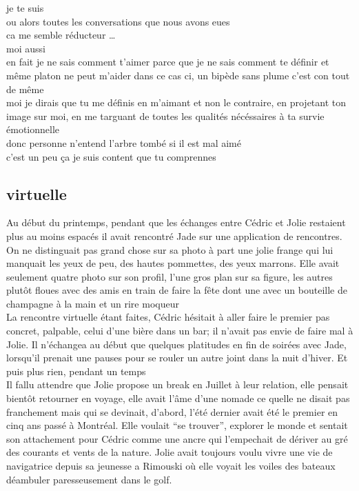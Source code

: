 \documentclass{article}
\begin{document}
je te suis\\

ou alors toutes les conversations que nous avons eues\\

ca me semble réducteur \ldots \\

moi aussi\\

en fait je ne sais comment t'aimer parce que je ne sais comment te définir
et même platon ne peut m'aider dans ce cas ci, un bipède sans plume  c'est con
tout de même\\

moi je dirais que tu me définis en m'aimant et non le contraire, en projetant
ton image sur moi, en me targuant de toutes les qualités nécéssaires à ta survie
émotionnelle\\

donc personne n'entend l'arbre tombé si il est mal aimé\\

c'est un peu ça je suis content que tu comprennes\\

\clearpage

\subsection{virtuelle}

Au début du printemps, pendant que les échanges entre Cédric et Jolie restaient
plus au moins espacés il avait rencontré Jade sur une application de rencontres.
On ne distinguait pas grand chose sur sa photo à part une jolie frange qui lui
manquait les yeux de peu, des hautes pommettes, des yeux marrons. Elle avait
seulement quatre photo sur son profil, l'une gros plan sur sa figure, les autres
plutôt floues avec des amis en train de faire la fête dont une avec un bouteille
de champagne à la main et un rire moqueur\\

La rencontre virtuelle étant faites, Cédric hésitait à aller faire le premier
pas concret, palpable, celui d'une bière dans un bar; il n'avait pas envie de faire mal
à Jolie. Il n'échangea au début que quelques platitudes en fin de soirées avec
Jade, lorsqu'il prenait une pauses pour se rouler un autre joint dans la nuit
d'hiver. Et puis plus rien, pendant un temps\\


Il fallu attendre que Jolie propose un break en Juillet à leur relation, elle
pensait bientôt retourner en voyage, elle avait l'âme d'une nomade ce quelle ne
disait pas franchement mais qui se devinait, d'abord, l'été dernier avait été le
premier en cinq ans passé à Montréal. Elle voulait ``se trouver'', explorer le monde
et sentait son attachement pour Cédric comme une ancre qui l'empechait de dériver
au gré des courants et vents de la nature. Jolie avait toujours voulu vivre une vie
de navigatrice depuis sa jeunesse a Rimouski où elle voyait les voiles des bateaux
déambuler paresseusement dans le  golf.\\
\end{document}
